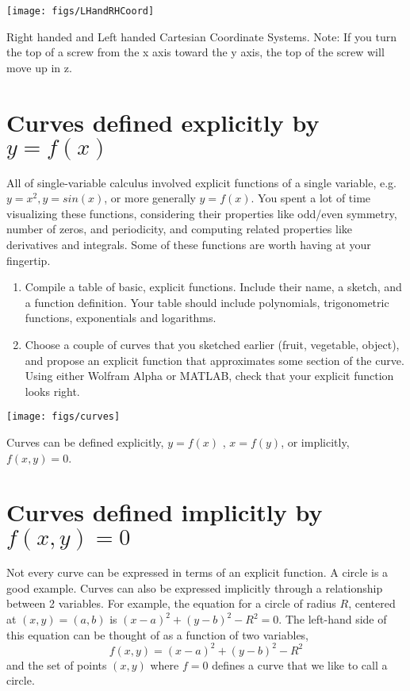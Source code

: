 \documentclass{tufte-handout}
\begin{document}
\begin{marginfigure}
\texttt{[image: figs/LHandRHCoord]}
\caption{Right handed and Left handed Cartesian Coordinate Systems.  Note:  If you turn the top of a screw from the x axis toward the y axis, the top of the screw will move up in z.}
\end{marginfigure}

\section{Curves defined explicitly by $y=f(x)$}

All of single-variable calculus involved explicit functions of a single variable, e.g. $y = x^2, y = sin(x)$, or more generally $y = f(x)$. You spent a lot of time visualizing these functions, considering their properties like odd/even symmetry, number of zeros, and periodicity, and computing related properties like derivatives and integrals. Some of these functions are worth having at your fingertip.

\begin{enumerate}[resume]
\item Compile a table of basic, explicit functions. Include their name, a sketch, and a function definition. Your table should include polynomials, trigonometric functions, exponentials and logarithms.
\item Choose a couple of curves that you sketched earlier (fruit, vegetable, object), and propose an explicit function that approximates some section of the curve.  Using either Wolfram Alpha or MATLAB, check that your explicit function looks right.
\end{enumerate}

\begin{marginfigure}
\texttt{[image: figs/curves]}
\caption{Curves can be defined explicitly, $y = f(x)$ , $x = f(y)$, or implicitly, $f(x,y)=0$.}
\end{marginfigure}

\section{Curves defined implicitly by $f(x,y)=0$}

Not every curve can be expressed in terms of an explicit function. A circle is a good example. Curves can also be expressed implicitly through a relationship between 2 variables. For example, the equation for a circle of radius $R$, centered at $(x,y)=(a,b)$ is $(x-a)^2 + (y-b)^2 - R^2 = 0$. The left-hand side of this equation can be thought of as a function of two variables,
\[f(x,y) = (x-a)^2 + (y-b)^2 - R^2 \]
and the set of points $(x,y)$ where $f=0$ defines a curve that we like to call a circle.
\end{document}
